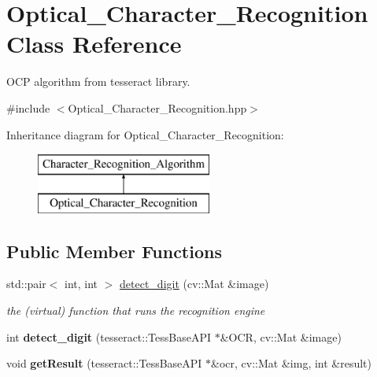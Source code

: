 \hypertarget{class_optical___character___recognition}{}\section{Optical\+\_\+\+Character\+\_\+\+Recognition Class Reference}
\label{class_optical___character___recognition}


O\+CP algorithm from tesseract library.  




{\ttfamily \#include $<$Optical\+\_\+\+Character\+\_\+\+Recognition.\+hpp$>$}

Inheritance diagram for Optical\+\_\+\+Character\+\_\+\+Recognition\+:\begin{figure}[H]
\begin{center}
\leavevmode
\includegraphics[height=2.000000cm]{class_optical___character___recognition}
\end{center}
\end{figure}
\subsection*{Public Member Functions}
\begin{DoxyCompactItemize}
\item 
\mbox{\label{class_optical___character___recognition_a8c405870698dce101accb38045f7cc33}} 
std\+::pair$<$ int, int $>$ \mbox{\hyperlink{class_optical___character___recognition_a8c405870698dce101accb38045f7cc33}{detect\+\_\+digit}} (cv\+::\+Mat \&image)
\begin{DoxyCompactList}\small\item\em the (virtual) function that runs the recognition engine \end{DoxyCompactList}\item 
\mbox{\label{class_optical___character___recognition_a98c90cdc763d0807fff61924812f4258}} 
int {\bfseries detect\+\_\+digit} (tesseract\+::\+Tess\+Base\+A\+PI $\ast$\&O\+CR, cv\+::\+Mat \&image)
\item 
\mbox{\label{class_optical___character___recognition_a206d7717fa04e0b46564f56fe0c27479}} 
void {\bfseries get\+Result} (tesseract\+::\+Tess\+Base\+A\+PI $\ast$\&ocr, cv\+::\+Mat \&img, int \&result)
\end{DoxyCompactItemize}
